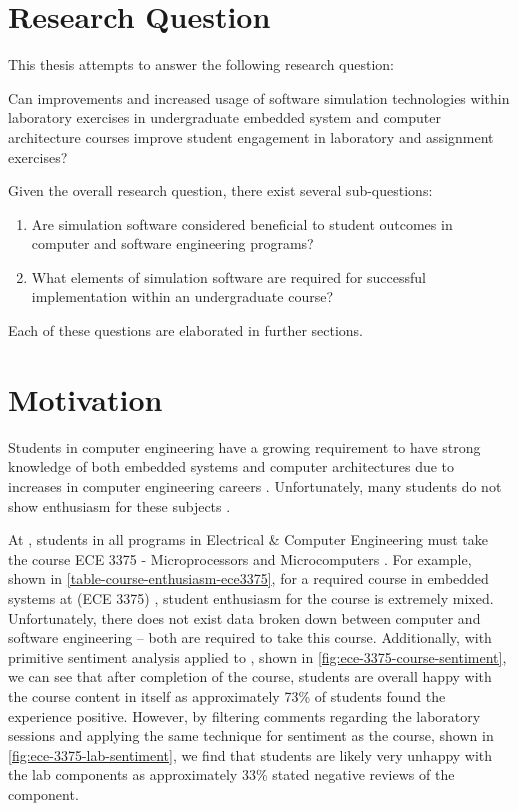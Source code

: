 \section{Research Question}

This thesis attempts to answer the following research question:
\begin{displayquote}
Can improvements and increased usage of software simulation technologies within laboratory exercises in undergraduate embedded system and computer architecture courses improve student engagement in laboratory and assignment exercises?
\end{displayquote}
Given the overall research question, there exist several sub-questions: 
\begin{enumerate}
	\item Are simulation software considered beneficial to student outcomes in computer and software engineering programs?
	\item What elements of simulation software are required for successful implementation within an undergraduate course?
\end{enumerate}
Each of these questions are elaborated in further sections. 

\section{Motivation}
\label{sec:motivation}

Students in computer engineering have a growing requirement to have strong knowledge of both embedded systems and computer architectures due to increases in computer engineering careers \cite{cec2016, bls2014}. Unfortunately, many students do not show enthusiasm for these subjects \cite{Ackovska2014,Ackovska2014,Stolikj2011}. 

At \uwo{}, students in all programs in Electrical \& Computer Engineering must take the course ECE 3375 - Microprocessors and Microcomputers \cite{uwo-we-programprogression, eceoutline-ece3375}. For example, shown in \cref{table-course-enthusiasm-ece3375}, for a required course in embedded systems at \uwo{} (ECE 3375) \cite{eceOutlines}, student enthusiasm for the course is extremely mixed. Unfortunately, there does not exist data broken down between computer and software engineering -- both are required to take this course. Additionally, with primitive sentiment analysis applied to \cite{evals:ece3375-2013, evals:ece3375-2014}, shown in \cref{fig:ece-3375-course-sentiment}, we can see that after completion of the course, students are overall happy with the course content in itself as approximately 73\% of students found the experience positive. However, by filtering comments regarding the laboratory sessions and applying the same technique for sentiment as the course, shown in \cref{fig:ece-3375-lab-sentiment}, we find that students are likely very unhappy with the lab components as approximately 33\% stated negative reviews of the component. 

